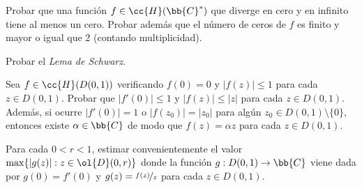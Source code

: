 \documentclass[12pt]{article}
\begin{document}
    \begin{ejercicio}[2.5 puntos]
        Probar que una función $f \in \cc{H}(\bb{C}^*)$ que diverge en cero y en infinito tiene al menos un cero. Probar además que el número de ceros de $f$ es finito y mayor o igual que 2 (contando multiplicidad).
    \end{ejercicio}

    \begin{ejercicio}[2.5 puntos]
        Probar el \emph{Lema de Schwarz}.
        \begin{lema*}[de Schwarz]
            Sea $f \in \cc{H}(D(0, 1))$ verificando $f(0) = 0$ y $|f(z)| \leq 1$ para cada $z \in D(0, 1)$. Probar que $|f'(0)| \leq 1$ y $|f(z)| \leq |z|$ para cada $z \in D(0, 1)$. Además, si ocurre $|f'(0)| = 1$ o $|f(z_0)| = |z_0|$ para algún $z_0 \in D(0, 1) \setminus \{0\}$, entonces existe $\alpha \in \bb{C}$ de modo que $f(z) = \alpha z$ para cada $z \in D(0, 1)$.
        \end{lema*}
        \begin{observacion}
            Para cada $0 < r < 1$, estimar convenientemente el valor $\max\{ |g(z)| : z \in \ol{D}(0, r) \}$ donde la función $g : D(0, 1) \to \bb{C}$ viene dada por $g(0) = f'(0)$ y $g(z) = \nicefrac{f(z)}{z}$ para cada $z \in D(0, 1)$.
        \end{observacion}
    \end{ejercicio}


    \newpage
    \setcounter{ejercicio}{0}
    
\end{document}
